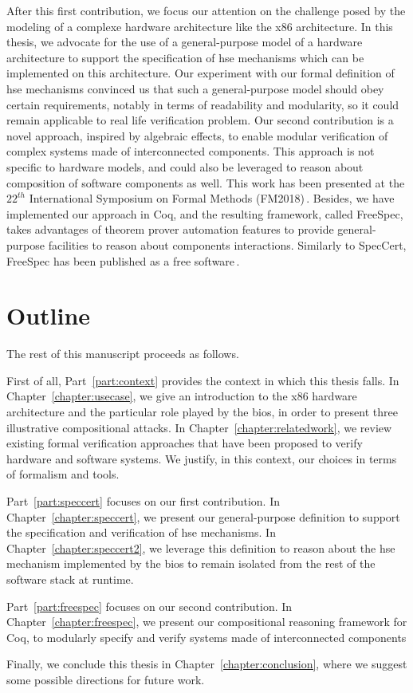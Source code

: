 After this first contribution, we focus our attention on the challenge posed by
the modeling of a complexe hardware architecture like the x86 architecture.
%
In this thesis, we advocate for the use of a general-purpose model of a hardware
architecture to support the specification of \ac{hse} mechanisms which can be
implemented on this architecture.
%
Our experiment with our formal definition of \ac{hse} mechanisms convinced us
that such a general-purpose model should obey certain requirements, notably in
terms of readability and modularity, so it could remain applicable to real life
verification problem.
%
Our second contribution is a novel approach, inspired by algebraic effects, to
enable modular verification of complex systems made of interconnected
components.
%
This approach is not specific to hardware models, and could also be leveraged to
reason about composition of software components as well.
%
This work has been presented at the $22^{th}$ International Symposium on Formal
Methods (FM2018)\,\cite{letan2018freespec}.
%
Besides, we have implemented our approach in Coq, and the resulting framework,
called FreeSpec, takes advantages of theorem prover automation features to
provide general-purpose facilities to reason about components interactions.
%
Similarly to SpecCert, FreeSpec has been published as a free
software\,\cite{letan2018freespeccode}.

\section{Outline}

The rest of this manuscript proceeds as follows.

First of all, Part~\ref{part:context} provides the context in which this thesis
falls.
%
In Chapter~\ref{chapter:usecase}, we give an introduction to the x86 hardware
architecture and the particular role played by the \ac{bios}, in order to
present three illustrative compositional attacks.
%
In Chapter~\ref{chapter:relatedwork}, we review existing formal verification
approaches that have been proposed to verify hardware and software systems.
%
We justify, in this context, our choices in terms of formalism and tools.

Part~\ref{part:speccert} focuses on our first contribution.
%
In Chapter~\ref{chapter:speccert}, we present our general-purpose definition to
support the specification and verification of
\ac{hse} mechanisms.
%
In Chapter~\ref{chapter:speccert2}, we leverage this definition to reason
about the \ac{hse} mechanism implemented by the \ac{bios} to remain isolated
from the rest of the software stack at runtime.

Part~\ref{part:freespec} focuses on our second contribution.
%
In Chapter~\ref{chapter:freespec}, we present our compositional reasoning
framework for Coq, to modularly specify and verify systems made of
interconnected components

Finally, we conclude this thesis in Chapter~\ref{chapter:conclusion}, where we
suggest some possible directions for future work.
